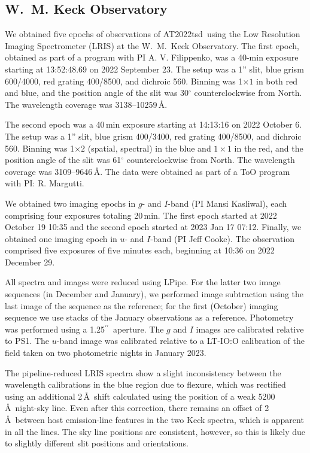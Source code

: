 \documentclass{nature_plusfigure}
\newcommand{\at}{AT2022tsd}
\newcommand{\arcsec}{$^{\prime\prime}$}
\begin{document}
\begin{methods}

\subsection{W.~M. Keck Observatory}
\label{sec:keck}

We obtained five epochs of observations of \at\ using the Low Resolution Imaging Spectrometer (LRIS\cite{Oke1995}) at the W.~M.~Keck Observatory. The first epoch, obtained as part of a program with PI A. V. Filippenko, was a 40-min exposure starting at 13:52:48.69 on 2022 September 23. The setup was a 1'' slit, blue grism 600/4000, red grating 400/8500, and dichroic 560. Binning was 1$\times1$ in both red and blue, and the position angle of the slit was 30$^\circ$ counterclockwise from North. The wavelength coverage was 3138--10259\,\AA. 

The second epoch was a 40\,min exposure starting at 14:13:16 on 2022 October 6. The setup was a 1'' slit, blue grism 400/3400, red grating 400/8500, and dichroic 560. Binning was 1$\times2$ (spatial, spectral) in the blue and $1\times1$ in the red, and the position angle of the slit was 61$^\circ$ counterclockwise from North. The wavelength coverage was 3109--9646\,\AA. The data were obtained as part of a ToO program with PI: R. Margutti. 

We obtained two imaging epochs in $g$- and $I$-band (PI Mansi Kasliwal), each comprising four exposures totaling 20\,min. The first epoch started at 2022 October 19 10:35 and the second epoch started at 2023 Jan 17 07:12. 
Finally, we obtained one imaging epoch in $u$- and $I$-band (PI Jeff Cooke). The observation comprised five exposures of five minutes each, beginning at 10:36 on 2022 December 29.

All spectra and images were reduced using LPipe\cite{PerleyLPipe}.
For the latter two image sequences (in December and January), we performed image subtraction using the last image of the sequence as the reference; for the first (October) imaging sequence we use stacks of the January observations as a reference.  Photometry was performed using a 1.25\arcsec\ aperture.  The $g$ and $I$ images are calibrated relative to PS1.  The $u$-band image was calibrated relative to a LT-IO:O calibration of the field taken on two photometric nights in January 2023.

The pipeline-reduced LRIS spectra show a slight inconsistency between the wavelength calibrations in the blue region due to flexure, which was rectified using an additional 2\,\AA\ shift calculated using the position of a weak 5200\,\AA\ night-sky line.
Even after this correction, there remains an offset of 2\,\AA\ between host emission-line features in the two Keck spectra, which is apparent in all the lines. The sky line positions are consistent, however, so this is likely due to slightly different slit positions and orientations. 



\end{methods}
\end{document}
